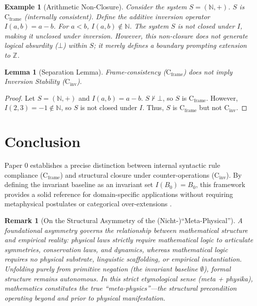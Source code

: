 \documentclass[11pt,a4paper]{article}
\newtheorem{lemma}[theorem]{Lemma}
\newtheorem{remark}[theorem]{Remark}
\newtheorem{example}[theorem]{Example}
\begin{document}
\begin{example}[Arithmetic Non-Closure]
Consider the system $S = (\mathbb{N}, +)$. $S$ is $\mathrm{C}_{\mathrm{frame}}$ 
(internally consistent). Define the additive inversion operator $I(a, b) = a - b$.
For $a < b$, $I(a,b) \notin \mathbb{N}$. The system $S$ is not closed 
under $I$, making it unclosed under inversion. However, this non-closure 
does not generate logical absurdity ($\bot$) within $S$; it merely 
defines a boundary prompting extension to $\mathbb{Z}$.
\end{example}

\begin{lemma}[Separation Lemma]
Frame-consistency ($\mathrm{C}_{\mathrm{frame}}$) does not imply 
Inversion Stability ($\mathrm{C}_{\mathrm{inv}}$).
\end{lemma}

\begin{proof}
Let $S = (\mathbb{N}, +)$ and $I(a, b) = a - b$. $S \nvdash \bot$, so $S$ is 
$\mathrm{C}_{\mathrm{frame}}$. However, $I(2, 3) = -1 \notin \mathbb{N}$, 
so $S$ is not closed under $I$. Thus, $S$ is $\mathrm{C}_{\mathrm{frame}}$ 
but not $\mathrm{C}_{\mathrm{inv}}$.
\end{proof}



\section{Conclusion}

Paper 0 establishes a precise distinction between internal syntactic rule 
compliance ($\mathrm{C}_{\mathrm{frame}}$) and structural closure under 
counter-operations ($\mathrm{C}_{\mathrm{inv}}$). By defining the invariant 
baseline as an invariant set $I(B_0) = B_0$, this framework provides a solid 
reference for domain-specific applications without requiring metaphysical 
postulates or categorical over-extensions 
\cite{nicht_physics_repo, apophatic_engine_pypi, apophatic_opt_pypi}.

\begin{remark}[On the Structural Asymmetry of the (Nicht-)``Meta-Physical'']
A foundational asymmetry governs the relationship between mathematical structure 
and empirical reality: physical laws strictly require mathematical logic to articulate 
symmetries, conservation laws, and dynamics, whereas mathematical logic requires no 
physical substrate, linguistic scaffolding, or empirical instantiation. 
Unfolding purely from primitive negation (the invariant baseline $\emptyset$), formal 
structure remains autonomous. In this strict etymological sense 
(\emph{meta} + \emph{physika}), mathematics constitutes the true ``meta-physics''---the 
structural precondition operating beyond and prior to physical manifestation.
\end{remark}

\clearpage


\end{document}
